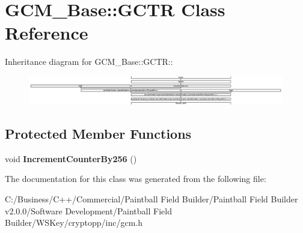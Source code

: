 \hypertarget{class_g_c_m___base_1_1_g_c_t_r}{
\section{GCM\_\-Base::GCTR Class Reference}
\label{class_g_c_m___base_1_1_g_c_t_r}
}
Inheritance diagram for GCM\_\-Base::GCTR::\begin{figure}[H]
\begin{center}
\leavevmode
\includegraphics[height=1.24444cm]{class_g_c_m___base_1_1_g_c_t_r}
\end{center}
\end{figure}
\subsection*{Protected Member Functions}
\begin{DoxyCompactItemize}
\item 
\hypertarget{class_g_c_m___base_1_1_g_c_t_r_a6cd1a7846f8605834a273bdfbeeea50a}{
void {\bfseries IncrementCounterBy256} ()}
\label{class_g_c_m___base_1_1_g_c_t_r_a6cd1a7846f8605834a273bdfbeeea50a}

\end{DoxyCompactItemize}


The documentation for this class was generated from the following file:\begin{DoxyCompactItemize}
\item 
C:/Business/C++/Commercial/Paintball Field Builder/Paintball Field Builder v2.0.0/Software Development/Paintball Field Builder/WSKey/cryptopp/inc/gcm.h\end{DoxyCompactItemize}
